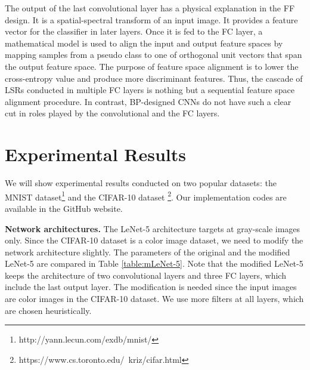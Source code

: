 \documentclass[preprint,12pt]{elsarticle}
\begin{document}
The output of the last convolutional layer has a physical explanation in
the FF design. It is a spatial-spectral transform of an input image. It
provides a feature vector for the classifier in later layers.  Once it
is fed to the FC layer, a mathematical model is used to align the input
and output feature spaces by mapping samples from a pseudo class to one
of orthogonal unit vectors that span the output feature space.  The
purpose of feature space alignment is to lower the cross-entropy value
and produce more discriminant features.  Thus, the cascade of LSRs
conducted in multiple FC layers is nothing but a sequential feature
space alignment procedure. In contrast, BP-designed CNNs do not have
such a clear cut in roles played by the convolutional and the FC layers. 

\section{Experimental Results}\label{sec:experiments}

We will show experimental results conducted on two popular datasets: the
MNIST dataset\footnote{http://yann.lecun.com/exdb/mnist/} and the
CIFAR-10 dataset \footnote{https://www.cs.toronto.edu/~kriz/cifar.html}. 
Our implementation codes are available in the GitHub website.

{\bf Network architectures.} The LeNet-5 architecture targets at
gray-scale images only. Since the CIFAR-10 dataset is a color image
dataset, we need to modify the network architecture slightly. The
parameters of the original and the modified LeNet-5 are compared in
Table \ref{table:mLeNet-5}. Note that the modified LeNet-5 keeps the
architecture of two convolutional layers and three FC layers, which
include the last output layer. The modification is needed since the
input images are color images in the CIFAR-10 dataset. We use more
filters at all layers, which are chosen heuristically. 
\end{document}
